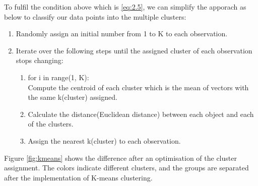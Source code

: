 \documentclass[11pt]{article} %
\theoremstyle{plain}
\theoremstyle{definition}
\begin{document}
To fulfil the condition above which is \eqref{eq:2.5}, we can simplify the apporach as below to classify our data points into the multiple clusters\cite{james/itsl:2009}:
{
  \begin{enumerate}
    \item Randomly assign an initial number from 1 to K to each observation.
    \item Iterate over the following steps until the assigned cluster of each observation stops changing:
    \begin{enumerate}
      \item for i in range(1, K): \\
      Compute the centroid of each cluster which is the mean of vectors with the same k(cluster) assigned.
      \item Calculate the distance(Euclidean distance) between each object and each of the clusters.
      \item  Assign the nearest k(cluster) to each observation.
    \end{enumerate}
  \end{enumerate}
}
Figure \ref{fig:kmeans} shows the difference after an optimisation of the cluster assignment. The colors indicate different clusters, and the groups are separated after the implementation of K-means clustering.
\end{document}
